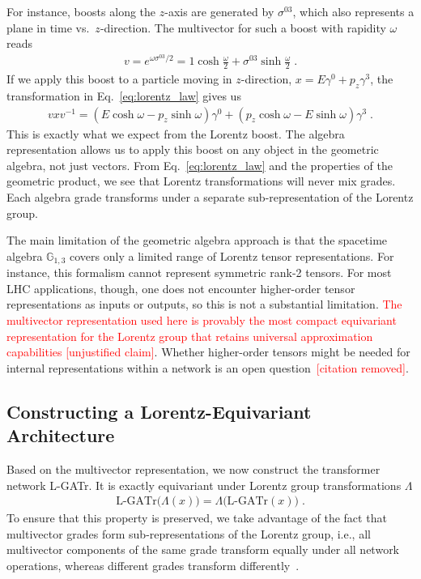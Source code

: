 \documentclass[submission, Phys]{SciPost}
\begin{document}
For instance, boosts along the $z$-axis are generated by $\sigma^{03}$, which also represents a plane in time vs.\ $z$-direction. The multivector for such a boost with rapidity $\omega$ reads
%
\begin{align}
    v = e^{\omega \sigma^{03}/2} = 1\cosh \frac{\omega}{2} + \sigma^{03}\sinh \frac{\omega}{2}  \; .
\end{align}
%
If we apply this boost to a particle moving in $z$-direction, $x=E\gamma^0+p_z\gamma^3$, the transformation in Eq.~\eqref{eq:lorentz_law} gives us 
%
\begin{align}
    vxv^{-1} = (E\cosh \omega - p_z\sinh \omega)\gamma^0 + (p_z\cosh \omega - E\sinh \omega)\gamma^3 \; .
\end{align}
%
This is exactly what we expect from the Lorentz boost. The algebra representation allows us to apply this boost on any object in the geometric algebra, not just vectors. From Eq.~\eqref{eq:lorentz_law} and the properties of the geometric product, we see that Lorentz transformations will never mix grades. Each algebra grade transforms under a separate sub-representation of the Lorentz group.

The main limitation of the geometric algebra approach is that the spacetime algebra $\mathbb{G}_{1,3}$ covers only a limited range of Lorentz tensor representations. For instance, this formalism cannot represent symmetric rank-2 tensors. For most LHC applications, though, one does not encounter higher-order tensor representations as inputs or outputs, so this is not a substantial limitation. \textcolor{red}{The multivector representation used here is provably the most compact equivariant representation for the Lorentz group that retains universal approximation capabilities [unjustified claim]}. Whether higher-order tensors might be needed for internal representations within a network is an open question\textcolor{red}{~[citation removed]}.

\subsection{Constructing a Lorentz-Equivariant Architecture}

Based on the multivector representation, we now construct the transformer network L-GATr. It is exactly equivariant under Lorentz group transformations $\Lambda$
%
\begin{align}
    \text{L-GATr}\Big(\Lambda(x)\Big) = \Lambda \Big(\text{L-GATr}(x)\Big) \; .
\end{align}
%
To ensure that this property is preserved, we take advantage of the fact that multivector grades form sub-representations of the Lorentz group, i.e., all multivector components of the same grade transform equally under all network operations, whereas different grades transform differently~\cite{brehmer2023geometric,Spinner:2024hjm}.
\end{document}
